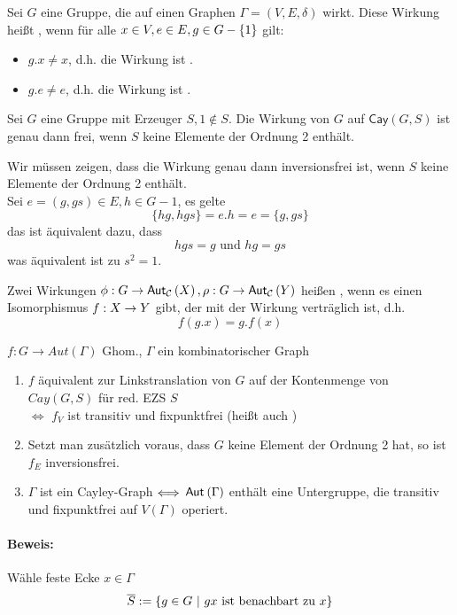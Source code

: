\documentclass{article}
\newcommand{\Cay}[2]{\textsf{Cay}(#1,#2)}
\renewcommand{\C}{\mathcal{C}}
\begin{document}

Sei $G$ eine Gruppe, die auf einen Graphen $\Gamma = (V,E, \delta)$ wirkt. Diese Wirkung heißt , wenn für alle $x\in V, e \in E, g \in G-\set{1}{}$ gilt:
\begin{itemize}
\item $g.x \neq x$, d.h. die Wirkung ist .
\item $g.e \neq e$, d.h. die Wirkung ist .
\end{itemize}


\Satz{}
Sei $G$ eine Gruppe mit Erzeuger $S, 1 \notin S$. Die Wirkung von $G$ auf $\Cay{G}{S}$ ist genau dann frei, wenn $S$ keine Elemente der Ordnung 2 enthält.
\begin{Beweis}{}
Wir müssen zeigen, dass die Wirkung genau dann inversionsfrei ist, wenn $S$ keine Elemente der Ordnung 2 enthält.\\
Sei $e = (g, gs) \in E, h \in G - 1$, es gelte
\[ \{hg, hgs\} = e.h = e = \{g, gs\} \]
das ist äquivalent dazu, dass
\[hgs = g \text{ und } hg = gs \]
was äquivalent ist zu $s^2 = 1$.
\end{Beweis}

Zwei Wirkungen $\phi : G \rightarrow \Aut{\C}{X}, \rho : G \pfeil{} \Aut{\C}{Y}$ heißen , wenn es einen Isomorphismus $f : X \overset{}{\rightarrow} Y$ gibt, der mit der Wirkung verträglich ist, d.h.
\[ f(g.x) = g.f(x) \]

$f : G \rightarrow Aut(\Gamma)$ Ghom., $\Gamma$ ein kombinatorischer Graph
\begin{enumerate}
	\item $f$ äquivalent zur Linkstranslation von $G$ auf der Kontenmenge von $Cay(G,S)$ für red. EZS $S$\\
	$\Longleftrightarrow$ $f_V$ ist transitiv und fixpunktfrei (heißt auch )
	\item Setzt man zusätzlich voraus, dass $G$ keine Element der Ordnung 2 hat, so ist $f_E$ inversionsfrei.
	\item $\Gamma$ ist ein Cayley-Graph $\overset{}{\Longleftrightarrow}$ $\textsf{Aut}_{}\left(\Gamma\right)$ enthält eine Untergruppe, die transitiv und fixpunktfrei auf $V(\Gamma)$ operiert.
\end{enumerate}

\paragraph{Beweis:}
Wähle feste Ecke $x\in \Gamma$\\
\[\overline{S} := \set{g\in G}{gx \text{ ist benachbart zu } x}\]
\end{document}

